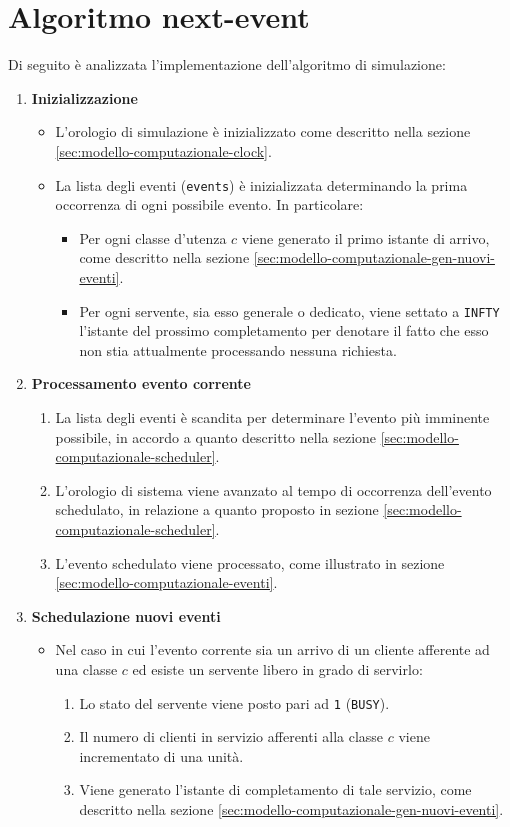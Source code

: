 \section{Algoritmo next-event}\label{sec:modello-computazionale-algoritmo}
Di seguito è analizzata l'implementazione dell'algoritmo di simulazione:
\begin{enumerate}[label=Step \arabic*), align=left, leftmargin=*]
\item \textbf{Inizializzazione}
\begin{itemize}
\item L'orologio di simulazione è inizializzato come descritto nella sezione \ref{sec:modello-computazionale-clock}.
\item La lista degli eventi (\texttt{events}) è inizializzata determinando la prima occorrenza di ogni possibile evento. In particolare:
\begin{itemize}
\item Per ogni classe d'utenza $c$ viene generato il primo istante di arrivo, come descritto nella sezione \ref{sec:modello-computazionale-gen-nuovi-eventi}.

\item Per ogni servente, sia esso generale o dedicato, viene settato a \texttt{INFTY} l'istante del prossimo completamento per denotare il fatto che esso non stia attualmente processando nessuna richiesta.
\end{itemize}
\end{itemize}
\item \textbf{Processamento evento corrente}
\begin{enumerate}
\item La lista degli eventi è scandita per determinare l'evento più imminente possibile, in accordo a quanto descritto nella sezione \ref{sec:modello-computazionale-scheduler}.
\item L'orologio di sistema viene avanzato al tempo di occorrenza dell'evento schedulato, in relazione a quanto proposto in sezione \ref{sec:modello-computazionale-scheduler}.
\item L'evento schedulato viene processato, come illustrato in sezione \ref{sec:modello-computazionale-eventi}.
\end{enumerate}
\item \textbf{Schedulazione nuovi eventi}
\begin{itemize}
\item Nel caso in cui l'evento corrente sia un arrivo di un cliente afferente ad una classe $c$ ed esiste un servente libero in grado di servirlo:
\begin{enumerate}[label=\Roman*.]
\item Lo stato del servente viene posto pari ad \texttt{1} (\texttt{BUSY}).
\item Il numero di clienti in servizio afferenti alla classe $c$ viene incrementato di una unità.
\item Viene generato l'istante di completamento di tale servizio, come descritto nella sezione \ref{sec:modello-computazionale-gen-nuovi-eventi}.
\end{enumerate}


\end{itemize}
\end{enumerate}
